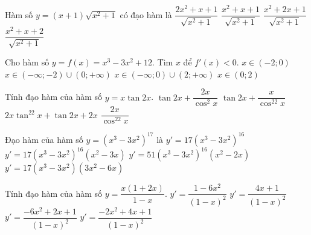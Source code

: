 \begin{ex}%
	Hàm số $y=(x+1)\sqrt{x^2+1}$  có đạo hàm là
	 \choice
		 {\True $\dfrac{2x^2+x+1}{\sqrt{x^2+1}}$}
		 {$\dfrac{x^2+x+1}{\sqrt{x^2+1}}$}
		{$\dfrac{x^2+2x+1}{\sqrt{x^2+1}}$} 
		{$\dfrac{x^2+x+2}{\sqrt{x^2+1}}$} 
\end{ex}

\begin{ex}%
	Cho hàm  số $y=f(x)=x^3-3x^2+12$. Tìm $x$ để $f'(x)<0$.
	\choice 
		{$x\in  (-2;0)$}
		{$x\in (-\infty;-2)\cup(0;+\infty)$} 
		 {$x\in (-\infty;0)\cup(2;+\infty)$}
		{\True $x \in (0;2)$} 
\end{ex}

\begin{ex}%
	Tính đạo hàm của hàm số $y=x\tan 2x$. 
	 \choice
		 {$\tan 2x+\dfrac{2x}{\cos^2x}$}
		{$\tan 2x+\dfrac{x}{\cos^22x}$} 
		{\True $2x\tan^22x+\tan  2x+2x$}
		{$\dfrac{2x}{\cos^22x}$} 
\end{ex}

\begin{ex}%
	Đạo hàm của hàm số  $y=(x^3-3x^2)^{17}$ là
	\choice 
		{$y'=17(x^3-3x^2)^{16}$} 
		 {$y'=17(x^3-3x^2)^{16}(x^2-3x)$}
		{\True $y'=51(x^3-3x^2)^{16}(x^2-2x)$} 
		 {$y'=17(x^3-3x^2)(3x^2-6x)$}
\end{ex}

\begin{ex}%
	Tính đạo  hàm của hàm số $y=\dfrac{x(1+2x)}{1-x}$.
	\choice 
		 {$y'=\dfrac{1-6x^2}{(1-x)^2}$}
		 {$y'=\dfrac{4x+1}{(1-x)^2}$}
		 {$y'=\dfrac{-6x^2+2x+1}{(1-x)^2}$}
		 {\True $y'=\dfrac{-2x^2+4x+1}{(1-x)^2}$}
\end{ex}

